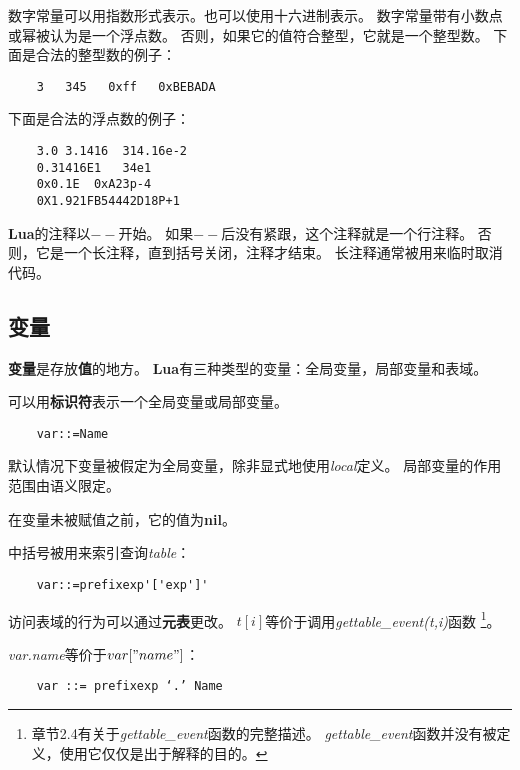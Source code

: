 \documentclass{ctexart}
\begin{document}
数字常量可以用指数形式表示。也可以使用十六进制表示。
数字常量带有小数点或幂被认为是一个浮点数。
否则，如果它的值符合整型，它就是一个整型数。
下面是合法的整型数的例子：

\lstset{language=C}
\begin{lstlisting}
	3   345   0xff   0xBEBADA
\end{lstlisting}

下面是合法的浮点数的例子：

\lstset{language=C}
\begin{lstlisting}
	3.0	3.1416	314.16e-2
	0.31416E1	34e1
	0x0.1E	0xA23p-4
	0X1.921FB54442D18P+1
\end{lstlisting}

\textbf{Lua}的注释以$--$开始。
如果$--$后没有紧跟，这个注释就是一个行注释。
否则，它是一个长注释，直到括号关闭，注释才结束。
长注释通常被用来临时取消代码。

\subsection{变量}

\textbf{变量}是存放\textbf{值}的地方。
\textbf{Lua}有三种类型的变量：全局变量，局部变量和表域。

可以用\textbf{标识符}表示一个全局变量或局部变量。

\lstset{language=C}
\begin{lstlisting}
	var::=Name
\end{lstlisting}

默认情况下变量被假定为全局变量，除非显式地使用\emph{local}定义。
局部变量的作用范围由语义限定。

在变量未被赋值之前，它的值为\textbf{nil}。

中括号被用来索引查询\emph{table}：

\lstset{language=C}
\begin{lstlisting}
	var::=prefixexp'['exp']'
\end{lstlisting}

访问表域的行为可以通过\textbf{元表}更改。
$t[i]$等价于调用\emph{gettable\_event(t,i)}函数
\footnote{章节2.4有关于\emph{gettable\_event}函数的完整描述。
\emph{gettable\_event}函数并没有被定义，使用它仅仅是出于解释的目的。}。

\emph{var.name}等价于$var["name"]$：

\lstset{language=C}
\begin{lstlisting}
	var ::= prefixexp ‘.’ Name
\end{lstlisting}
\end{document}
